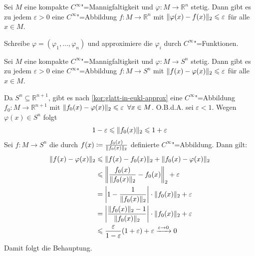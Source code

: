 \begin{korollar}[label=kor:glatt-in-eukl-approx,{name=[Approximation von Abbildungen in den euklidischen Raum]}]
	Sei $M$ eine kompakte $C^\infty$"=Mannigfaltigkeit und $\varphi \colon M \to \mathbb{R}^n$ stetig. 
	Dann gibt es zu jedem $\varepsilon >0$ eine $C^\infty$"=Abbildung $f \colon M \to \mathbb{R}^n$ mit $\norm{\varphi(x)- f(x)}_2  \le \varepsilon$ für alle $x \in M$.
\end{korollar}
\begin{beweis}
	Schreibe $\varphi= (\varphi_1, \ldots , \varphi_n)$ und approximiere die $\varphi_i$ durch $C^\infty$"=Funktionen.
\end{beweis}

\begin{korollar}[label=kor:approx-to-sphere,{name=[Approximation von Abbildungen in eine Sphäre]}]
	Sei $M$ eine kompakte $C^\infty$"=Mannigfaltigkeit und $\varphi \colon M \to S^n$ stetig. 
	Dann gibt es zu jedem $\varepsilon >0$ eine $C^\infty$"=Abbildung $f \colon M \to S^n$ mit $\norm{f(x)- \varphi(x)}_2 \le \varepsilon$ für alle $x \in M$.
\end{korollar}
\begin{beweis}
	Da $S^n \subseteq \mathbb{R}^{n+1}$, gibt es nach \cref{kor:glatt-in-eukl-approx} eine $C^\infty$"=Abbildung $f_0 \colon M \to \mathbb{R}^{n+1}$ mit $\norm{f_0(x)-\varphi(x)}_2 \le \varepsilon \enspace \forall x \in M$. 
	O.B.d.A. sei $\varepsilon <1$. 
	Wegen $\varphi(x) \in S^n$ folgt
	\[
		1 - \varepsilon \le \norm{f_0(x)}_2 \le 1+ \varepsilon 
	\]
	Sei $f \colon M \to S^n$ die durch $f(x) \coloneqq \frac{f_0(x)}{\norm{f_0(x)}_2}$ definierte $C^\infty$"=Abbildung. 
	Dann gilt: 
	\begin{align*}
		\norm{f(x)- \varphi(x)}_2 &\le \norm{f(x)- f_0(x)}_2 + \norm{f_0(x)- \varphi(x)}_2   \\
		&\le \norm*{\frac{f_0(x)}{\norm{f_0(x)}_2 } - f_0(x)}_2 + \varepsilon \\
		&= \abs*{1- \frac{1}{\norm{f_0(x)}_2 } } \cdot \norm{f_0(x)}_2 + \varepsilon \\
		&= \abs*{\frac{\norm{f_0(x)}_2 -1 }{\norm{f_0(x)}_2 }} \cdot \norm{f_0(x)}_2 + \varepsilon \\
		&\le \frac{\varepsilon}{1 - \varepsilon} (1+ \varepsilon) + \varepsilon \xrightarrow{\varepsilon \to 0} 0
	\end{align*}
	Damit folgt die Behauptung.
\end{beweis}

